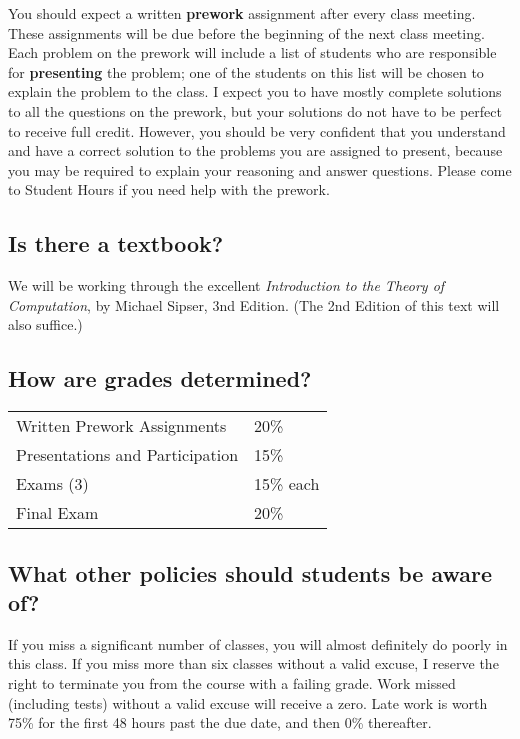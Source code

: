 \documentclass[
  twoside]{article}
\begin{document}
You should expect a written \textbf{prework} assignment after every
class meeting. These assignments will be due before the beginning of the
next class meeting. Each problem on the prework will include a list of
students who are responsible for \textbf{presenting} the problem; one of
the students on this list will be chosen to explain the problem to the
class. I expect you to have mostly complete solutions to all the
questions on the prework, but your solutions do not have to be perfect
to receive full credit. However, you should be very confident that you
understand and have a correct solution to the problems you are assigned
to present, because you may be required to explain your reasoning and
answer questions. Please come to Student Hours if you need help with the
prework.

\hypertarget{is-there-a-textbook}{%
\subsection{Is there a textbook?}\label{is-there-a-textbook}}

We will be working through the excellent \emph{Introduction to the
Theory of Computation}, by Michael Sipser, 3nd Edition. (The 2nd Edition
of this text will also suffice.)

\hypertarget{how-are-grades-determined}{%
\subsection{How are grades
determined?}\label{how-are-grades-determined}}

\begin{tabular}[t]{ll}
\toprule
Written Prework Assignments & 20\%\\
Presentations and Participation & 15\%\\
Exams (3) & 15\% each\\
Final Exam & 20\%\\
\bottomrule
\end{tabular}

\hypertarget{what-other-policies-should-students-be-aware-of}{%
\subsection{What other policies should students be aware
of?}\label{what-other-policies-should-students-be-aware-of}}

If you miss a significant number of classes, you will almost definitely
do poorly in this class. If you miss more than six classes without a
valid excuse, I reserve the right to terminate you from the course with
a failing grade. Work missed (including tests) without a valid excuse
will receive a zero. Late work is worth 75\% for the first 48 hours past
the due date, and then 0\% thereafter.
\end{document}
